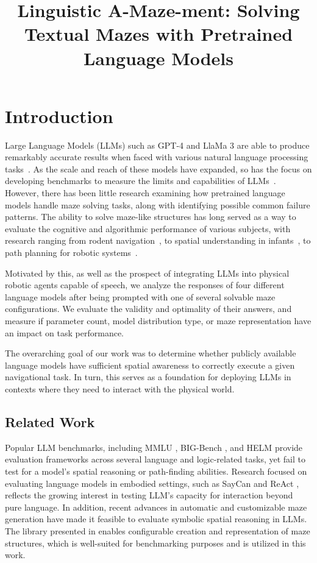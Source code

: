 \documentclass[conference]{IEEEtran}
\title{Linguistic A-Maze-ment: Solving Textual Mazes with Pretrained Language Models}
\author{\IEEEauthorblockN{Gabriel Del Castillo\IEEEauthorrefmark{1}, Nate Webster\IEEEauthorrefmark{2}}
\IEEEauthorblockA{\textit{Department of Computer Science} \\
\textit{Colorado School of Mines}\\
Golden, CO, USA \\
\IEEEauthorrefmark{1}gdelcastillo@mines.edu,
\IEEEauthorrefmark{2}nwebster@mines.edu
}
}
\begin{document}
\maketitle

\begin{abstract}
\end{abstract}

\section{Introduction}

Large Language Models (LLMs) such as GPT-4 and LlaMa 3 are able to produce remarkably accurate results when faced with various natural language processing tasks~\cite{openai}. As the scale and reach of these models have expanded, so has the focus on developing benchmarks to measure the limits and capabilities of LLMs~\cite{srivastava, liang}. However, there has been little research examining how pretrained language models handle maze solving tasks, along with identifying possible common failure patterns. The ability to solve maze-like structures has long served as a way to evaluate the cognitive and algorithmic performance of various subjects, with research ranging from rodent navigation~\cite{tolman}, to spatial understanding in infants~\cite{piaget}, to path planning for robotic systems~\cite{stentz}.

Motivated by this, as well as the prospect of integrating LLMs into physical robotic agents capable of speech, we analyze the responses of four different language models after being prompted with one of several solvable maze configurations. We evaluate the validity and optimality of their answers, and measure if parameter count, model distribution type, or maze representation have an impact on task performance.

The overarching goal of our work was to determine whether publicly available language models have sufficient spatial awareness to correctly execute a given navigational task. In turn, this serves as a foundation for deploying LLMs in contexts where they need to interact with the physical world.

\subsection{Related Work}
Popular LLM benchmarks, including MMLU \cite{hendrycks}, BIG-Bench \cite{srivastava}, and HELM \cite{liang} provide evaluation frameworks across several language and logic-related tasks, yet fail to test for a model's spatial reasoning or path-finding abilities. Research focused on evaluating language models in embodied settings, such as SayCan \cite{ahn} and ReAct \cite{yao}, reflects the growing interest in testing LLM's capacity for interaction beyond pure language. In addition, recent advances in automatic and customizable maze generation have made it feasible to evaluate symbolic spatial reasoning in LLMs. The library presented in \cite{ivanitskiy} enables configurable creation and representation of maze structures, which is well-suited for benchmarking purposes and is utilized in this work.
\end{document}

